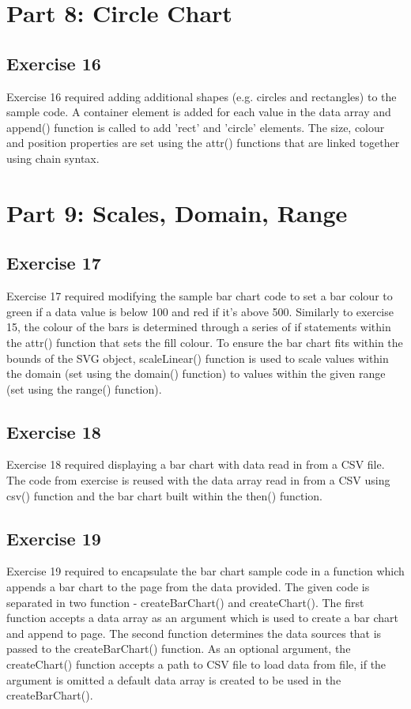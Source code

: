 \documentclass[11pt]{article}   	%
\begin{document}
\section{Part 8: Circle Chart}
\subsection{Exercise 16 }
\vspace{-1em}
Exercise 16 required adding additional shapes (e.g. circles and rectangles) to the sample code. A container element is added for each value in the data array and append() function is called to add 'rect' and 'circle' elements. The size, colour and position properties are set using the attr() functions that are linked together using chain syntax. 


\section{ Part 9: Scales, Domain, Range }
\subsection{Exercise 17 }
\vspace{-1em}
Exercise 17 required modifying the sample bar chart code to set a bar colour to green if a data value is below 100 and red if it's above 500. Similarly to exercise 15, the colour of the bars is determined through a series of if statements within the attr() function that sets the fill colour. To ensure the bar chart fits within the bounds of the SVG object, scaleLinear() function is used to scale values within the domain (set using the domain() function) to values within the given range (set using the range() function). 

\subsection{ Exercise 18 }
\vspace{-1em}
Exercise 18 required displaying a bar chart with data read in from a CSV file. The code from exercise is reused with the data array read in from a CSV using csv() function and the bar chart built within the then() function.

\subsection{ Exercise 19 }
\vspace{-1em}
Exercise 19 required to encapsulate the bar chart sample code in a function which appends a bar chart to the page from the data provided. The given code is separated in two function - createBarChart() and createChart(). The first function accepts a data array as an argument which is used to create a bar chart and append to page. The second function determines the data sources that is passed to the createBarChart() function. As an optional argument, the createChart() function accepts a path to CSV file to load data from file, if the argument is omitted a default data array is created to be used in the createBarChart().
\end{document}
